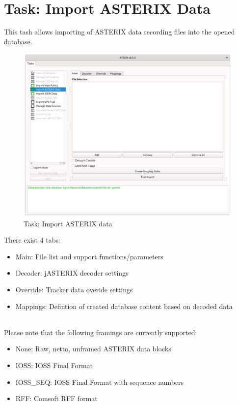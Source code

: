 \section{Task: Import ASTERIX Data}
\label{sec:task_import_asterix}

This tash allows importing of ASTERIX data recording files into the opened database. \\

\begin{figure}[H]
  \hspace*{-2.5cm}
    \includegraphics[width=19cm]{../screenshots/asterix_import_data.png}
  \caption{Task: Import ASTERIX data}
\end{figure}

There exist 4 tabs:

\begin{itemize}  
\item Main: File list and support functions/parameters
\item Decoder: jASTERIX decoder settings
\item Override: Tracker data overide settings
\item Mappings: Defintion of created database content based on decoded data
\end{itemize}
\ \\

Please note that the following framings are currently supported:
\begin{itemize}  
\item None: Raw, netto, unframed ASTERIX data blocks
\item IOSS: IOSS Final Format
\item IOSS\_SEQ: IOSS Final Format with sequence numbers
\item RFF: Comsoft RFF format
\end{itemize}
\ \\

